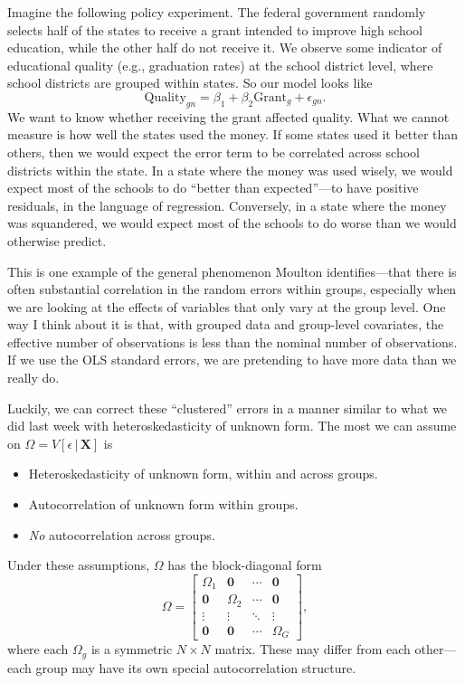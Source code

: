 \documentclass[12pt,oneside,openany]{book}
\begin{document}
Imagine the following policy experiment. The federal government randomly
selects half of the states to receive a grant intended to improve high
school education, while the other half do not receive it. We observe
some indicator of educational quality (e.g., graduation rates) at the
school district level, where school districts are grouped within states.
So our model looks like \[
\text{Quality}_{gn} = \beta_1 + \beta_2 \text{Grant}_g + \epsilon_{gn}.
\] We want to know whether receiving the grant affected quality. What we
cannot measure is how well the states used the money. If some states
used it better than others, then we would expect the error term to be
correlated across school districts within the state. In a state where
the money was used wisely, we would expect most of the schools to do
``better than expected''---to have positive residuals, in the language
of regression. Conversely, in a state where the money was squandered, we
would expect most of the schools to do worse than we would otherwise
predict.

This is one example of the general phenomenon Moulton
\citetext{\citeyear{Moulton:1986kw}; \citeyear{Moulton:1990bl}}
identifies---that there is often substantial correlation in the random
errors within groups, especially when we are looking at the effects of
variables that only vary at the group level. One way I think about it is
that, with grouped data and group-level covariates, the effective number
of observations is less than the nominal number of observations. If we
use the OLS standard errors, we are pretending to have more data than we
really do.

Luckily, we can correct these ``clustered'' errors in a manner similar
to what we did last week with heteroskedasticity of unknown form. The
most we can assume on \(\Omega = V[\epsilon \,|\, \mathbf{X}]\) is

\begin{itemize}
\item
  Heteroskedasticity of unknown form, within and across groups.
\item
  Autocorrelation of unknown form within groups.
\item
  \emph{No} autocorrelation across groups.
\end{itemize}

Under these assumptions, \(\Omega\) has the block-diagonal form \[
\Omega = \begin{bmatrix}
  \Omega_1 & \mathbf{0} & \cdots & \mathbf{0} \\
  \mathbf{0} & \Omega_2 & \cdots & \mathbf{0} \\
  \vdots & \vdots & \ddots & \vdots \\
  \mathbf{0} & \mathbf{0} & \cdots & \Omega_G
\end{bmatrix},
\] where each \(\Omega_g\) is a symmetric \(N \times N\) matrix. These
may differ from each other---each group may have its own special
autocorrelation structure.
\end{document}
